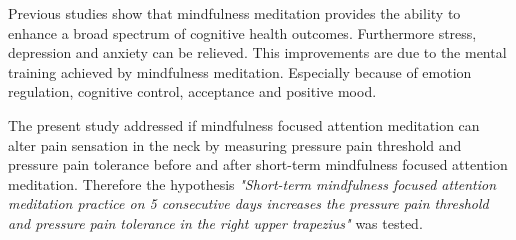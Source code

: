 Previous studies show that mindfulness meditation provides the ability to enhance a broad spectrum of cognitive health outcomes. Furthermore stress, depression and anxiety can be relieved. This improvements are due to the mental training achieved by mindfulness meditation. Especially because of emotion regulation, cognitive control, acceptance and positive mood. \cite{Zeidan2016,Zeidan2012} 


The present study addressed if mindfulness focused attention meditation can alter pain sensation in the neck by measuring pressure pain threshold and pressure pain tolerance before and after short-term mindfulness focused attention meditation. Therefore the hypothesis  \textit{"Short-term mindfulness focused attention meditation practice on 5 consecutive days increases the pressure pain threshold and pressure pain tolerance in the right upper trapezius"} was tested.

